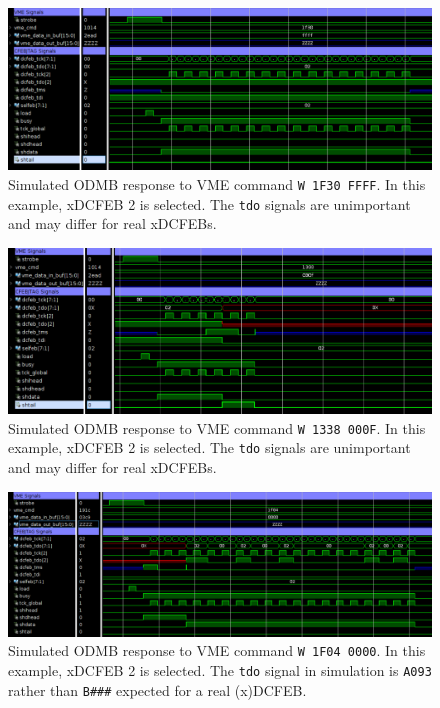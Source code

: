 \documentclass[10pt,a4paper]{article}
\begin{document}
\begin{figure}[H]
\centering
\includegraphics[width= 1.0 \textwidth]{figures/cfebjtag_1f30.png}
\caption{Simulated ODMB response to VME command \texttt{W 1F30 FFFF}. In this example, xDCFEB 2 is selected. The \texttt{tdo} signals are unimportant and may differ for real xDCFEBs.}
\label{fig:jtag1f30}
\end{figure}

\begin{figure}[H]
\centering
\includegraphics[width= 1.0 \textwidth]{figures/cfebjtag_1338.png}
\caption{Simulated ODMB response to VME command \texttt{W 1338 000F}. In this example, xDCFEB 2 is selected. The \texttt{tdo} signals are unimportant and may differ for real xDCFEBs.}
\label{fig:jtag1338}
\end{figure}

\begin{figure}[H]
\centering
\includegraphics[width= 1.0 \textwidth]{figures/cfebjtag_1f04.png}
\caption{Simulated ODMB response to VME command \texttt{W 1F04 0000}. In this example, xDCFEB 2 is selected. The \texttt{tdo} signal in simulation is \texttt{A093} rather than \texttt{B\#\#\#}
expected for a real (x)DCFEB.}
\label{fig:jtag1f04}
\end{figure}
\end{document}

